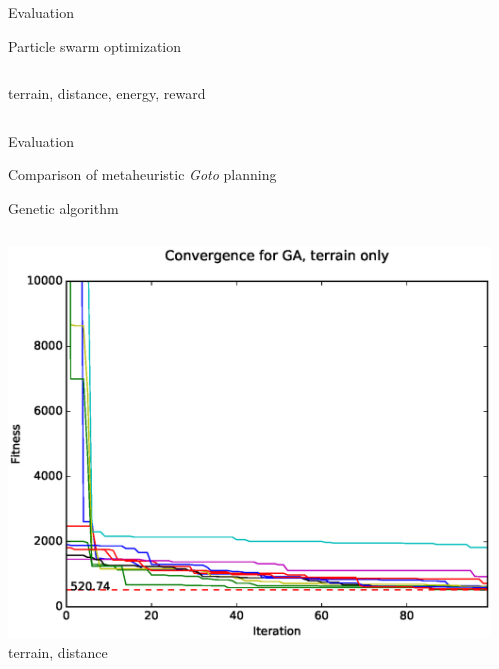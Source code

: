 \documentclass[9pt]{beamer}
\begin{document}
\begin{frame}{Evaluation}
\begin{block}{Particle swarm optimization}
\begin{columns}
\begin{column}{0.5\textwidth}
\begin{center}
                    \linebreak
                    terrain, distance, energy, reward
                \end{center}
            \end{column}
        \end{columns}
    \end{block}
\end{frame}

\begin{frame}{Evaluation}
    \begin{block}{Comparison of metaheuristic \textit{Goto} planning}
    \end{block}
    \begin{block}{Genetic algorithm}
        \begin{columns}
            \begin{column}{0.5\textwidth}
                \begin{center}
                    \includegraphics[width=\textwidth,trim={.75cm .75cm 0cm 1cm},clip]{img/conv_GA_a.eps}
                    \linebreak
                    terrain, distance
                \end{center}
            \end{column}
            \begin{column}{0.5\textwidth}
                \begin{center}

\end{center}
\end{column}
\end{columns}
\end{block}
\end{frame}
\end{document}
